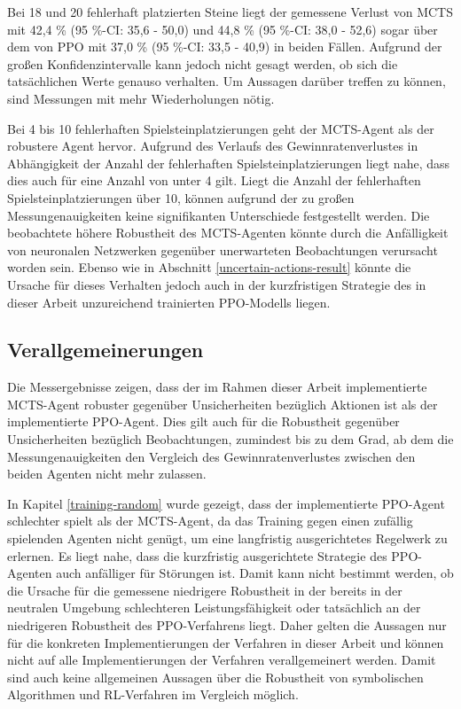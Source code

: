 Bei 18 und 20 fehlerhaft platzierten Steine liegt der gemessene Verlust von MCTS mit 42,4 \% (95 \%-CI: 35,6 - 50,0) und 44,8 \% (95 \%-CI: 38,0 - 52,6) sogar über dem von PPO mit 37,0 \% (95 \%-CI: 33,5 - 40,9) in beiden Fällen. Aufgrund der großen Konfidenzintervalle kann jedoch nicht gesagt werden, ob sich die tatsächlichen Werte genauso verhalten. Um Aussagen darüber treffen zu können, sind Messungen mit mehr Wiederholungen nötig.

Bei 4 bis 10 fehlerhaften Spielsteinplatzierungen geht der MCTS-Agent als der robustere Agent hervor. Aufgrund des Verlaufs des Gewinnratenverlustes in Abhängigkeit der Anzahl der fehlerhaften Spielsteinplatzierungen liegt nahe, dass dies auch für eine Anzahl von unter 4 gilt. Liegt die Anzahl der fehlerhaften Spielsteinplatzierungen über 10, können aufgrund der zu großen Messungenauigkeiten keine signifikanten Unterschiede festgestellt werden. Die beobachtete höhere Robustheit des MCTS-Agenten könnte durch die Anfälligkeit von neuronalen Netzwerken gegenüber unerwarteten Beobachtungen verursacht worden sein. Ebenso wie in Abschnitt \ref{uncertain-actions-result} könnte die Ursache für dieses Verhalten jedoch auch in der kurzfristigen Strategie des in dieser Arbeit unzureichend trainierten PPO-Modells liegen.

\subsection{Verallgemeinerungen}

Die Messergebnisse zeigen, dass der im Rahmen dieser Arbeit implementierte MCTS-Agent robuster gegenüber Unsicherheiten bezüglich Aktionen ist als der implementierte PPO-Agent. Dies gilt auch für die Robustheit gegenüber Unsicherheiten bezüglich Beobachtungen, zumindest bis zu dem Grad, ab dem die Messungenauigkeiten den Vergleich des Gewinnratenverlustes zwischen den beiden Agenten nicht mehr zulassen.

In Kapitel \ref{training-random} wurde gezeigt, dass der implementierte PPO-Agent schlechter spielt als der MCTS-Agent, da das Training gegen einen zufällig spielenden Agenten nicht genügt, um eine langfristig ausgerichtetes Regelwerk zu erlernen. Es liegt nahe, dass die kurzfristig ausgerichtete Strategie des PPO-Agenten auch anfälliger für Störungen ist. Damit kann nicht bestimmt werden, ob die Ursache für die gemessene niedrigere Robustheit in der bereits in der neutralen Umgebung schlechteren Leistungsfähigkeit oder tatsächlich an der niedrigeren Robustheit des PPO-Verfahrens liegt. Daher gelten die Aussagen nur für die konkreten Implementierungen der Verfahren in dieser Arbeit und können nicht auf alle Implementierungen der Verfahren verallgemeinert werden. Damit sind auch keine allgemeinen Aussagen über die Robustheit von symbolischen Algorithmen und RL-Verfahren im Vergleich möglich.

